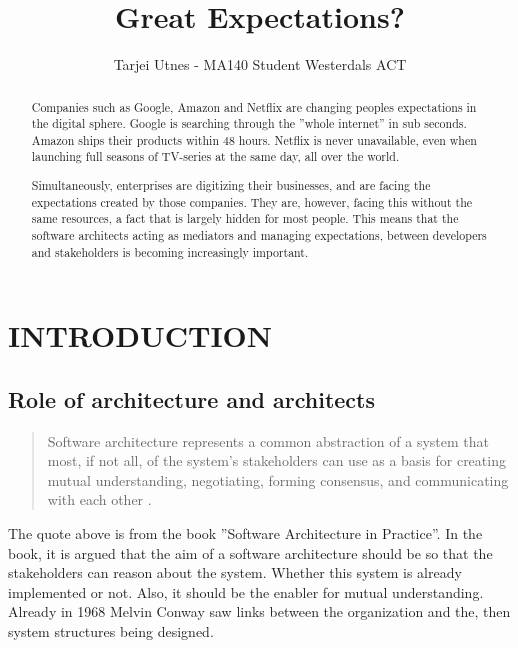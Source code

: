 \documentclass[a4paper, 10pt, conference]{ieeeconf}      %
\title{\LARGE \bf
Great Expectations?}
\author{Tarjei Utnes - MA140 Student Westerdals ACT}%
\begin{document}
\maketitle
\thispagestyle{empty}
\pagestyle{empty}


\begin{abstract}

Companies such as Google, Amazon and Netflix are changing peoples expectations in the digital sphere. Google is searching through the ''whole internet'' in sub seconds. Amazon ships their products within 48 hours. Netflix is never unavailable, even when launching full seasons of TV-series at the same day, all over the world.

Simultaneously, enterprises are digitizing their businesses, and are facing the expectations created by those companies. They are, however, facing this without the same resources, a fact that is largely hidden for most people.
This means that the software architects acting as mediators and managing expectations, between developers and stakeholders is becoming increasingly important.
\end{abstract}


\section{INTRODUCTION}
\subsection{Role of architecture and architects}
\blockquote{Software architecture represents a common abstraction of a system that most, if not all, of the system’s stakeholders can use as a basis for creating mutual understanding, negotiating, forming consensus, and communicating with each other \cite{c1}.}

The quote above is from the book ''Software Architecture in Practice''\cite{c1}. In the book, it is argued that the aim of a software architecture should be so that the stakeholders can reason about the system. Whether this system is already implemented or not. Also, it should be the enabler for mutual understanding.
Already in 1968 Melvin Conway \cite{c3} saw links between the organization and the, then system structures being designed.
\end{document}
